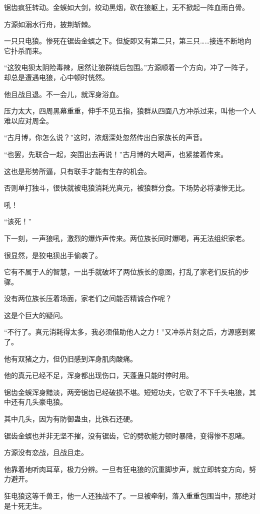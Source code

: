 \begin{this_body}
锯齿疯狂转动。金蜈如大剑，绞动黑烟，砍在狼躯上，无不掀起一阵血雨白骨。

方源如溺水行舟，披荆斩棘。

一只只电狼。惨死在锯齿金蜈之下。但旋即又有第二只，第三只……接连不断地向它扑杀而来。

“这狡电狈太阴险毒辣，居然让狼群绕后包围。”方源顺着一个方向，冲了一阵子，却总是遭遇电狼，心中顿时恍然。

他且战且退。不一会儿，就浑身浴血。

压力太大，四周黑幕重重，伸手不见五指，狼群从四面八方冲杀过来，叫他一个人难以应对周全。

“古月博，你怎么说？”这时，浓烟深处忽然传出白家族长的声音。

“也罢，先联合一起，突围出去再说！”古月博的大喝声，也紧接着传来。

这也是形势所逼，只有联手才能有生存的机会。

否则单打独斗，很快就被电狼消耗光真元，被狼群分食。下场势必将凄惨无比。

吼！

“该死！”

下一刻，一声狼吼，激烈的爆炸声传来。两位族长同时爆喝，再无法组织家老。

很显然，是狡电狈出手偷袭了。

它有不属于人的智慧，一出手就破坏了两位族长的意图，打乱了家老们反抗的步骤。

没有两位族长压着场面，家老们之间能否精诚合作呢？

这是个巨大的疑问。

“不行了。真元消耗得太多，我必须借助他人之力！”又冲杀片刻之后，方源感到累了。

他有双猪之力，但仍旧感到浑身肌肉酸痛。

他的真元已经不足，浑身都出现伤口，天蓬蛊只能时停时用。

锯齿金蜈浑身黯淡，两旁锯齿已经破损不堪。短短功夫，它砍了不下千头电狼，其中还有几头豪电狼。

其中几头，因为有防御蛊虫，比铁石还硬。

锯齿金蜈也并非无坚不摧，没有锯齿，它的劈砍能力顿时暴降，变得惨不忍睹。

方源没有恋战，且战且走。

他靠着地听肉耳草，极力分辨。一旦有狂电狼的沉重脚步声，就立即转变方向，努力避开。

狂电狼这等千兽王，他一人还独战不了。一旦被牵制，落入重重包围当中，那绝对是十死无生。


\end{this_body}
